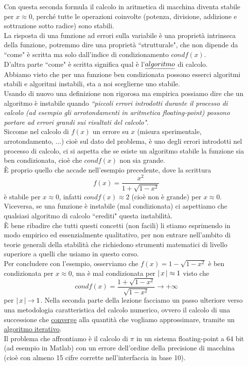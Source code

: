 \documentclass[12pt]{article}
\DeclarePairedDelimiter{\abs}{\lvert}{\rvert}
\begin{document}
Con questa seconda formula il calcolo in aritmetica di macchina diventa stabile per $x \approx 0$, perché tutte le operazioni coinvolte (potenza, divisione, addizione e sottrazione sotto radice) sono stabili.\\
La risposta di una funzione ad errori sulla variabile è una proprietà intrinseca della funzione, potremmo dire una proprietà ``strutturale", che non dipende da ``come" è scritta ma solo dall'indice di condizionamento $cond f(x)$.\\ 
D'altra parte ``come" è scritta significa qual è l'$\uline{algoritmo}$ di calcolo.\\
Abbiamo visto che per una funzione ben condizionata possono esserci algoritmi stabili e algoritmi instabili, sta a noi sceglierne uno stabile.\\ 
Usando di nuovo una definizione non rigorosa ma empirica possiamo dire che un algoritmo è instabile quando \textit{``piccoli errori introdotti durante il processo di calcolo (ad esempio gli arrotondamenti in aritmetica floating-point) possono portare ad errori grandi sui risultati del calcolo"}.\\
\newline
Siccome nel calcolo di $f(x)$ un errore su $x$ (misura sperimentale, arrotondamento, $\dotsc$) cioè sul dato del problema, è uno degli errori introdotti nel processo di calcolo, ci si aspetta che se esiste un algoritmo stabile la funzione sia ben condizionata, cioè che $condf(x)$ non sia grande.\\ 
È proprio quello che accade nell'esempio precedente, dove la scrittura 
\[f(x) = \frac{x^2}{1+\sqrt{1-x^2}}\] è stabile per $x\approx 0$, infatti $condf(x)\approx 2$ (cioè non è grande) per $x\approx 0$.\\
Viceversa, se una funzione è instabile (mal condizionata) ci aspettiamo che qualsiasi algoritmo di calcolo ``erediti" questa instabilità.\\
È bene ribadire che tutti questi concetti (non facili) li stiamo esprimendo in modo empirico ed essenzialmente qualitativo, per non entrare nell'ambito di teorie generali della stabilità che richiedono strumenti matematici di livello superiore a quelli che usiamo in questo corso.\\
\newline
Per concludere con l'esempio, osserviamo che $f(x) = 1-\sqrt{1-x^2}$ è ben condizionata per $x \approx 0$, ma è mal condizionata per $\abs{\,x\,} \approx 1$ visto che \[condf(x) = \frac{1+\sqrt{1-x^2}}{\sqrt{1-x^2}} \to +\infty \] 
per $\abs{\,x\,} \to 1$.\newline \newline
Nella seconda parte della lezione facciamo un passo ulteriore verso una metodologia caratteristica del calcolo numerico, ovvero il calcolo di una successione che \uline{converge} alla quantità che vogliamo approssimare, tramite un \uline{algoritmo iterativo}.\\
Il problema che affrontiamo è il calcolo di $\pi$ in un sistema floating-point a 64 bit (ad esempio in Matlab) con un errore dell'ordine della precisione di 
macchina (cioè con almeno 15 cifre corrette nell'interfaccia in base 10).
\end{document}
